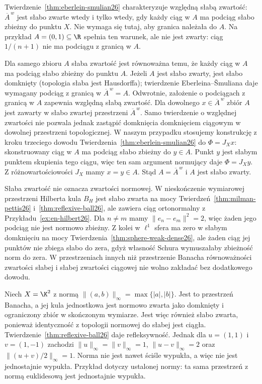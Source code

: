 \begin{uwaga}
\label{rem:weak-compact-what26}
Twierdzenie~\ref{thm:eberlein-smulian26} charakteryzuje
względną słabą zwartość: $\overline A^{\,w}$ jest
słabo zwarte wtedy i tylko wtedy, gdy każdy ciąg
w $A$ ma podciąg słabo zbieżny do punktu $X$.
Nie wymaga się tutaj, aby granica należała do $A$.
Na przykład $A=(0,1)\subseteq\R$ spełnia ten warunek,
ale nie jest zwarty: ciąg $1/(n+1)$ nie ma podciągu
z granicą w $A$.

Dla samego zbioru $A$ słaba zwartość jest równoważna
temu, że każdy ciąg w $A$ ma podciąg słabo zbieżny
do punktu $A$. Jeżeli $A$ jest słabo zwarty, jest
słabo domknięty (topologia słaba jest Hausdorffa);
twierdzenie Eberleina--\v Smuliana daje wymagany
podciąg z granicą w $\overline A^{\,w}=A$.
Odwrotnie, założenie o podciągach z granicą w $A$
zapewnia względną słabą zwartość. Dla dowolnego
$x\in\overline A^{\,w}$ zbiór $A$ jest zawarty
w słabo zwartej przestrzeni $\overline A^{\,w}$.
Samo twierdzenie o względnej zwartości nie pozwala
jednak zastąpić domknięcia domknięciem ciągowym
w dowolnej przestrzeni topologicznej.
W naszym przypadku stosujemy konstrukcję z kroku
trzeciego dowodu Twierdzenia~\ref{thm:eberlein-smulian26}
do $\Phi=J_Xx$: skonstruowany ciąg w $A$ ma
podciąg słabo zbieżny do $y\in A$. Punkt $y$ jest
słabym punktem skupienia tego ciągu, więc ten sam
argument normujący daje $\Phi=J_Xy$.
Z różnowartościowości $J_X$ mamy $x=y\in A$.
Stąd $A=\overline A^{\,w}$ i $A$ jest słabo zwarty.

Słaba zwartość nie oznacza zwartości normowej.
W nieskończenie wymiarowej przestrzeni Hilberta
kula $B_H$ jest słabo zwarta na mocy
Twierdzeń~\ref{thm:milman-pettis26}
i~\ref{thm:reflexive-ball26}, ale zawiera ciąg
ortonormalny z Przykładu~\ref{ex:en-hilbert26}.
Dla $n\ne m$ mamy $\|e_n-e_m\|^2=2$, więc żaden
jego podciąg nie jest normowo zbieżny.
Z kolei w $\ell^1$ sfera ma zero w słabym
domknięciu na mocy Twierdzenia~\ref{thm:sphere-weak-dense26},
ale żaden ciąg jej punktów nie zbiega słabo do zera,
gdyż własność Schura wymuszałaby zbieżność norm do zera.
W przestrzeniach innych niż przestrzenie Banacha
równoważności zwartości słabej i słabej zwartości
ciągowej nie wolno zakładać bez dodatkowego dowodu.
\end{uwaga}

\begin{przyklad}
\label{ex:reflexive-not-uniform26}
Niech $X=\K^2$ z normą $\|(a,b)\|_\infty=\max\{|a|,|b|\}$.
Jest to przestrzeń Banacha, a jej kula jednostkowa
jest normowo zwarta jako domknięty i ograniczony
zbiór w skończonym wymiarze. Jest więc również
słabo zwarta, ponieważ identyczność z topologii
normowej do słabej jest ciągła.
Twierdzenie~\ref{thm:reflexive-ball26} daje refleksywność.
Jednak dla $u=(1,1)$ i $v=(1,-1)$ zachodzi
$\|u\|_\infty=\|v\|_\infty=1$,
$\|u-v\|_\infty=2$ oraz $\|(u+v)/2\|_\infty=1$.
Norma nie jest nawet ściśle wypukła, a więc nie
jest jednostajnie wypukła.
Przykład dotyczy ustalonej normy: ta sama przestrzeń
z normą euklidesową jest jednostajnie wypukła.
\end{przyklad}

